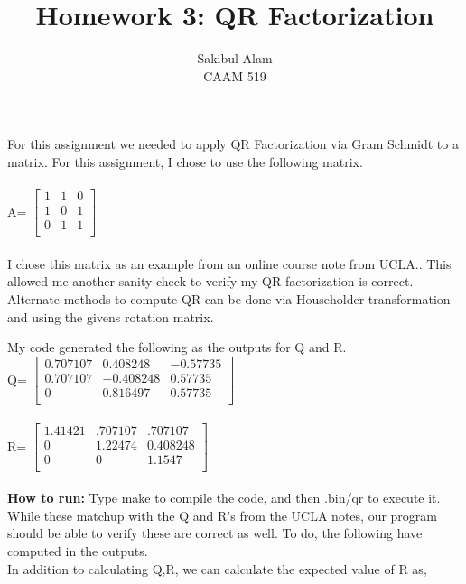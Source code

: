 \documentclass[12pt]{article}
\begin{document}
 
 
\title{Homework 3: QR Factorization}%
\author{Sakibul Alam\\ %
CAAM 519} %

\maketitle

For this assignment we needed to apply QR Factorization via Gram Schmidt to a matrix. For this assignment, I chose to use the following matrix. \\ \\
A=
$\begin{bmatrix}
    1       & 1 & 0 \\
  1       & 0 & 1 \\
  0       & 1 & 1 \\
\end{bmatrix}$
\\ \\

I chose this matrix as an example from an online course note from UCLA.\cite{ucla}. This allowed me another sanity check to verify my QR factorization is correct. Alternate methods to compute QR can be done via Householder transformation and using the givens rotation matrix.

My code generated the following as the outputs for Q and R. \\

Q=
$\begin{bmatrix}
     0.707107       & 0.408248 & -0.57735 \\
  0.707107       & -0.408248 & 0.57735 \\
  0       & 0.816497 & 0.57735 \\
\end{bmatrix}$
\\ \\

R=
$\begin{bmatrix}
   1.41421       & .707107 & .707107 \\
  0       & 1.22474 & 0.408248 \\
  0       & 0 & 1.1547 \\
\end{bmatrix}$
\\ \\
\textbf{How to run:} Type make to compile the code, and then .bin/qr to execute it. 
While these matchup with the Q and R's from the UCLA notes, our program should be able to verify these are correct as well. To do, the following have computed in the outputs.
\\
In addition to calculating Q,R, we can calculate the expected value of R as,
\end{document}
